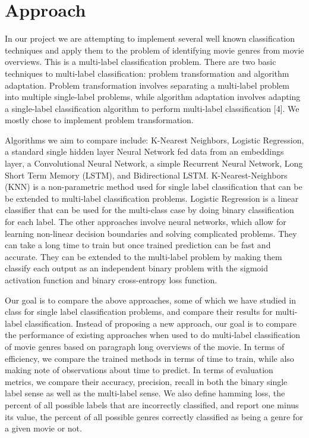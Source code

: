 \documentclass[sigconf]{acmart}
\begin{document}
\section{Approach}
In our project we are attempting to implement several well known classification techniques and apply them to the problem of identifying movie genres from movie overviews. This is a multi-label classification problem. There are two basic techniques to multi-label classification: problem transformation and algorithm adaptation. Problem transformation involves separating a multi-label problem into multiple single-label problems, while algorithm adaptation involves adapting a single-label classification algorithm to perform multi-label classification [4]. We mostly chose to implement problem transformation.

Algorithms we aim to compare include: K-Nearest Neighbors, Logistic Regression, a standard single hidden layer Neural Network fed data from an embeddings layer, a Convolutional Neural Network, a simple Recurrent Neural Network, Long Short Term Memory (LSTM), and Bidirectional LSTM. K-Nearest-Neighbors (KNN) is a non-parametric method used for single label classification that can be be extended to multi-label classification problems. Logistic Regression is a linear classifier that can be used for the multi-class case by doing binary classification for each label. The other approaches involve neural networks, which allow for learning non-linear decision boundaries and solving complicated problems. They can take a long time to train but once trained prediction can be fast and accurate. They can be extended to the multi-label problem by making them classify each output as an independent binary problem with the sigmoid activation function and binary cross-entropy loss function.  

Our goal is to compare the above approaches, some of which we have studied in class for single label classification problems, and compare their results for multi-label classification. Instead of proposing a new approach, our goal is to compare the performance of existing approaches when used to do multi-label classification of movie genres based on paragraph long overviews of the movie. In terms of efficiency, we compare the trained methods in terms of time to train, while also making note of observations about time to predict. In terms of evaluation metrics, we compare their accuracy, precision, recall in both the binary single label sense as well as the multi-label sense. We also define hamming loss, the percent of all possible labels that are incorrectly classified, and report one minus its value, the percent of all possible genres correctly classified as being a genre for a given movie or not. 
\end{document}
